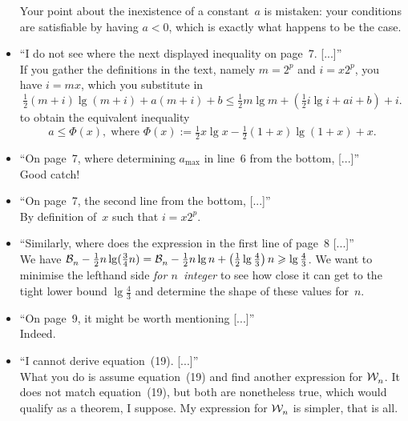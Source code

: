 \documentclass[10pt]{article}
\begin{document}
\begin{itemize}
Your point about the inexistence of a constant~\(a\) is mistaken: your
conditions are satisfiable by having \(a < 0\), which is exactly what
happens to be the case.

  \item ``I do not see where the next displayed inequality on
    page~7. [...]''\\
    If you gather the definitions in the text, namely \(m=2^p\) and
    \(i=x2^p\), you have \(i=mx\), which you substitute in 
\begin{equation*}
\tfrac{1}{2}(m+i)\lg(m+i) + a(m+i) + b
\leqslant
\tfrac{1}{2}m\lg m + (\tfrac{1}{2}i\lg i + ai + b) + i.
\end{equation*}
to obtain the equivalent inequality
\begin{equation*}
a \leqslant \Phi(x), \;\text{where \(\Phi(x) := \tfrac{1}{2}x\lg x - \tfrac{1}{2}(1+x)\lg(1+x) + x\)}.
\end{equation*}

\item ``On page~7, where determining \(a_{\text{max}}\) in line~6 from
  the bottom, [...]''\\
  Good catch!

  \item ``On page~7, the second line from the bottom, [...]''\\
    By definition of~\(x\) such that \(i=x2^p\).

  \item ``Similarly, where does the expression in the first line of
    page~8 [...]''\\
    We have \(\mathcal{B}_{n}^{} - \tfrac{1}{2}n\lg(\tfrac{3}{4}n) = \mathcal{B}_{n}^{} -
    \tfrac{1}{2}n\lg n + \left(\tfrac{1}{2}\lg\tfrac{4}{3}\right)n
    \geqslant \lg\tfrac{4}{3}\). We want to minimise the lefthand side
    \emph{for \(n\)~integer} to see how close it can get to the tight
    lower bound \(\lg\tfrac{4}{3}\) and determine the shape of
    these values for~\(n\).

  \item ``On page~9, it might be worth mentioning [...]''\\
    Indeed.

  \item ``I cannot derive equation~(19). [...]''\\
    What you do is assume equation~(19) and find another expression
    for \(\mathcal{W}_{n}^{}\). It does not match equation~(19), but both are
    nonetheless true, which would qualify as a theorem, I suppose. My
    expression for \(\mathcal{W}_{n}^{}\) is simpler, that is all.


\end{itemize}
\end{document}
